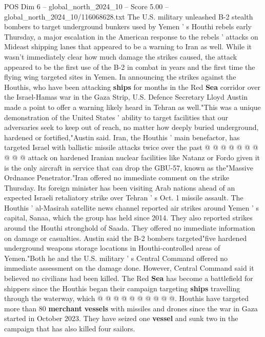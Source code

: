 \begin{textsample}{POS Dim 6 – global\_north\_2024\_10 – Score 5.00 – global\_north\_2024\_10/116068628.txt}  \label{ex:f6_pos_394}
The U.S. military unleashed B-2 stealth bombers to target underground bunkers used by Yemen ' s Houthi rebels early Thursday, a major escalation in the American response to the rebels ' attacks on Mideast shipping lanes that appeared to be a warning to Iran as well.
While it wasn't immediately clear how much damage the strikes caused, the attack appeared to be the first use of the B-2 in combat in years and the first time the flying wing targeted sites in Yemen.
In announcing the strikes against the Houthis, who have been attacking \textbf{ships} for months in the Red \textbf{Sea} corridor over the Israel-Hamas war in the Gaza Strip, U.S.
Defence Secretary Lloyd Austin made a point to offer a warning likely heard in Tehran as well."This was a unique demonstration of the United States ' ability to target facilities that our adversaries seek to keep out of reach, no matter how deeply buried underground, hardened or fortified,"Austin said.
Iran, the Houthis ' main benefactor, has targeted Israel with ballistic missile attacks twice over the past @ @ @ @ @ @ @ @ @ @ attack on hardened Iranian nuclear facilities like Natanz or Fordo given it is the only aircraft in service that can drop the GBU-57, known as the"Massive Ordnance Penetrator."Iran offered no immediate comment on the strike Thursday.
Its foreign minister has been visiting Arab nations ahead of an expected Israeli retaliatory strike over Tehran ' s Oct. 1 missile assault.
The Houthis ' al-Masirah satellite news channel reported air strikes around Yemen ' s capital, Sanaa, which the group has held since 2014.
They also reported strikes around the Houthi stronghold of Saada.
They offered no immediate information on damage or casualties.
Austin said the B-2 bombers targeted"five hardened underground weapons storage locations in Houthi-controlled areas of Yemen."Both he and the U.S. military ' s Central Command offered no immediate assessment on the damage done.
However, Central Command said it believed no civilians had been killed.
The Red \textbf{Sea} has become a battlefield for shippers since the Houthis began their campaign targeting \textbf{ships} travelling through the waterway, which @ @ @ @ @ @ @ @ @ @.
Houthis have targeted more than 80 \textbf{merchant} \textbf{vessels} with missiles and drones since the war in Gaza started in October 2023.
They have seized one \textbf{vessel} and sunk two in the campaign that has also killed four sailors.

\end{textsample}
